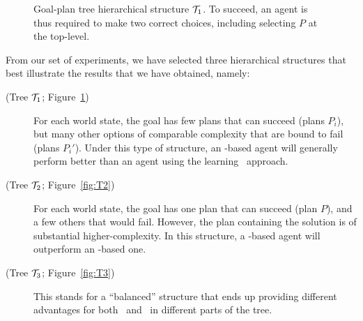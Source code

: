 \begin{figure}[t]
\begin{center}

\end{center}
\caption{Goal-plan tree hierarchical structure ${\mathcal{T}}_1$. To succeed, an agent is thus required to make
two correct choices, including selecting $P$ at the top-level.}
\label{fig:T1}
\end{figure}


From our set of experiments, we have selected three hierarchical structures that
best illustrate the results that we have obtained, namely:
\begin{description}
\item[(Tree ${\mathcal{T}}_1$; Figure~\ref{fig:T1})] For each world state, the goal has
few plans that can succeed (plans $P_i$), but many other options of comparable
complexity that are bound to fail (plans $P_i'$). 
Under this type of structure, an \CL-based agent will generally perform better 
than an agent using the learning \BUL\ approach.

\item[(Tree ${\mathcal{T}}_2$; Figure~\ref{fig:T2})] For each world state, the goal has
one plan that can succeed (plan $P$), and a few others that would fail.
However, the plan containing the solution is of substantial higher-complexity. 
In this structure, a \BUL-based agent will outperform an \CL-based one.

\item[(Tree ${\mathcal{T}}_3$; Figure~\ref{fig:T3})] This stands for a ``balanced''
structure that ends up providing different advantages for both \BUL\ and \CL\ in
different parts of the tree.
\end{description}




